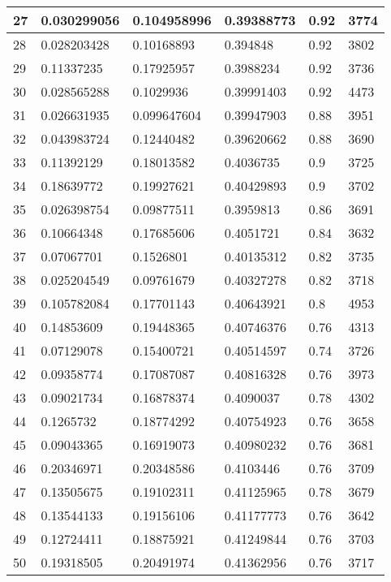 \begin{longtable}{|l|l|l|l|l|l|}
27 & 0.030299056 & 0.104958996 & 0.39388773 & 0.92 & 3774 \\ \hline 
28 & 0.028203428 & 0.10168893 & 0.394848 & 0.92 & 3802 \\ \hline 
29 & 0.11337235 & 0.17925957 & 0.3988234 & 0.92 & 3736 \\ \hline 
30 & 0.028565288 & 0.1029936 & 0.39991403 & 0.92 & 4473 \\ \hline 
31 & 0.026631935 & 0.099647604 & 0.39947903 & 0.88 & 3951 \\ \hline 
32 & 0.043983724 & 0.12440482 & 0.39620662 & 0.88 & 3690 \\ \hline 
33 & 0.11392129 & 0.18013582 & 0.4036735 & 0.9 & 3725 \\ \hline 
34 & 0.18639772 & 0.19927621 & 0.40429893 & 0.9 & 3702 \\ \hline 
35 & 0.026398754 & 0.09877511 & 0.3959813 & 0.86 & 3691 \\ \hline 
36 & 0.10664348 & 0.17685606 & 0.4051721 & 0.84 & 3632 \\ \hline 
37 & 0.07067701 & 0.1526801 & 0.40135312 & 0.82 & 3735 \\ \hline 
38 & 0.025204549 & 0.09761679 & 0.40327278 & 0.82 & 3718 \\ \hline 
39 & 0.105782084 & 0.17701143 & 0.40643921 & 0.8 & 4953 \\ \hline 
40 & 0.14853609 & 0.19448365 & 0.40746376 & 0.76 & 4313 \\ \hline 
41 & 0.07129078 & 0.15400721 & 0.40514597 & 0.74 & 3726 \\ \hline 
42 & 0.09358774 & 0.17087087 & 0.40816328 & 0.76 & 3973 \\ \hline 
43 & 0.09021734 & 0.16878374 & 0.4090037 & 0.78 & 4302 \\ \hline 
44 & 0.1265732 & 0.18774292 & 0.40754923 & 0.76 & 3658 \\ \hline 
45 & 0.09043365 & 0.16919073 & 0.40980232 & 0.76 & 3681 \\ \hline 
46 & 0.20346971 & 0.20348586 & 0.4103446 & 0.76 & 3709 \\ \hline 
47 & 0.13505675 & 0.19102311 & 0.41125965 & 0.78 & 3679 \\ \hline 
48 & 0.13544133 & 0.19156106 & 0.41177773 & 0.76 & 3642 \\ \hline 
49 & 0.12724411 & 0.18875921 & 0.41249844 & 0.76 & 3703 \\ \hline 
50 & 0.19318505 & 0.20491974 & 0.41362956 & 0.76 & 3717 \\ \hline 
\end{longtable}